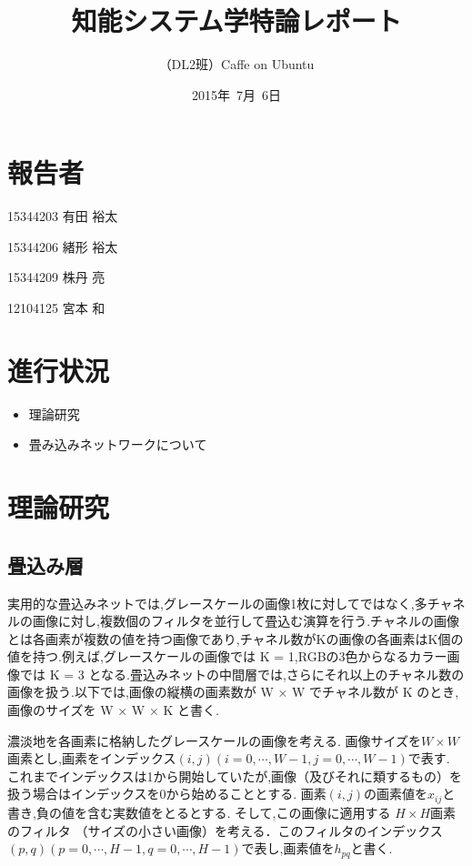 \documentclass[a4paper,10pt]{jsarticle}
\title{知能システム学特論レポート}
\author{
（DL2班）Caffe on Ubuntu\\
}
\date{2015年\ 7月\ 6日}
\begin{document}
\maketitle
\section{報告者}
\begin{list}{}{}
 \item 15344203\hspace{0.5cm} 有田 裕太
 \item 15344206\hspace{0.5cm} 緒形 裕太
 \item 15344209\hspace{0.5cm} 株丹 亮
 \item 12104125\hspace{0.5cm} 宮本 和
\end{list}

\section{進行状況}

\begin{itemize}
\item 理論研究
\item 畳み込みネットワークについて
\end{itemize}

\section{理論研究}

\subsection{畳込み層}

実用的な畳込みネットでは,グレースケールの画像1枚に対してではなく,多チャネルの画像に対し,複数個のフィルタを並行して畳込む演算を行う.チャネルの画像とは各画素が複数の値を持つ画像であり,チャネル数がKの画像の各画素はK個の値を持つ.例えば,グレースケールの画像では K = 1,RGBの3色からなるカラー画像では K = 3 となる.畳込みネットの中間層では,さらにそれ以上のチャネル数の画像を扱う.以下では,画像の縦横の画素数が W × W でチャネル数が K のとき,画像のサイズを W × W × K と書く.

濃淡地を各画素に格納したグレースケールの画像を考える.
画像サイズを$W\times W$画素とし,画素をインデックス$(i,j)(i = 0,\cdots,W-1, j = 0,\cdots,W-1)$で表す.
これまでインデックスは1から開始していたが,画像（及びそれに類するもの）を扱う場合はインデックスを0から始めることとする.
画素$(i,j)$の画素値を$x_{ij}$と書き,負の値を含む実数値をとるとする.
そして,この画像に適用する $H\times H$画素のフィルタ
（サイズの小さい画像）を考える．このフィルタのインデックス$(p,q)(p=0,\cdots,H-1, q=0,\cdots,H-1)$で表し,画素値を$h_{pq}$と書く.
\end{document}
